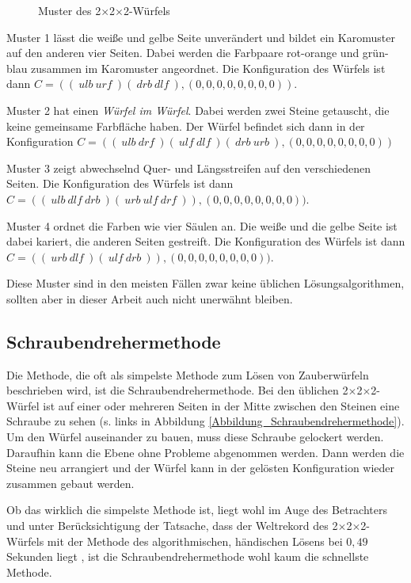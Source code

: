 \documentclass[12pt,a4paper, usenames, dvipsnames]{article}
\theoremstyle{mystyle}
\theoremstyle{definition}
\newcommand{\Ttwo}{2$\times$2$\times$2-}
\begin{document}
\begin{figure}[h]
\caption{Muster des \Ttwo Würfels}
\label{Abbildung_Muster}
\end{figure}

Muster 1 lässt die weiße und gelbe Seite unverändert und bildet ein Karomuster auf den anderen vier Seiten. Dabei werden die Farbpaare rot-orange und grün-blau zusammen im  Karomuster angeordnet. Die Konfiguration des Würfels ist dann $C = ((\ \textit{ulb} \ \textit{urf} \ )( \ \textit{drb} \ \textit{dlf} \ ),(0,0,0,0,0,0,0,0))$.

Muster 2 hat einen \textit{Würfel im Würfel}. Dabei werden zwei Steine getauscht, die keine gemeinsame Farbfläche haben. Der Würfel befindet sich dann in der Konfiguration $C = (( \ ulb \ drf \ )( \ ulf \ dlf \ )( \ drb \ urb \ ),(0,0,0,0,0,0,0,0))$

Muster 3 zeigt abwechselnd Quer- und Längsstreifen auf den verschiedenen Seiten. Die Konfiguration des Würfels ist dann $C = (( \ \textit{ulb} \ \textit{dlf} \ \textit{drb} \ )( \ \textit{urb} \ \textit{ulf} \ \textit{drf} \ )),(0,0,0,0,0,0,0,0))$.

Muster 4 ordnet die Farben wie vier Säulen an. Die weiße und die gelbe Seite ist dabei kariert, die anderen Seiten gestreift. Die Konfiguration des Würfels ist dann $C = ( (\ \textit{urb} \ \textit{dlf} \ )( \ \textit{ulf} \ \textit{drb} \ ) ),(0,0,0,0,0,0,0,0))$.


Diese Muster sind in den meisten Fällen zwar keine üblichen Lösungsalgorithmen, sollten aber in dieser Arbeit auch nicht unerwähnt bleiben.

%
%
%
%
%
%
%
%
%
%
%
%
%
%
%
%
%
%
%
\subsection{Schraubendrehermethode}

Die Methode, die oft als simpelste Methode zum Lösen von Zauberwürfeln beschrieben wird, ist die Schraubendrehermethode.
Bei den üblichen \Ttwo Würfel ist auf einer oder mehreren Seiten in der Mitte zwischen den Steinen eine Schraube zu sehen (s. links in Abbildung \ref{Abbildung_Schraubendrehermethode}).
Um den Würfel auseinander zu bauen, muss diese Schraube gelockert werden. Daraufhin kann die Ebene ohne Probleme abgenommen werden. 
Dann werden die Steine neu arrangiert und der Würfel kann in der gelösten Konfiguration wieder zusammen gebaut werden.

Ob das wirklich die simpelste Methode ist, liegt wohl im Auge des Betrachters und unter Berücksichtigung der Tatsache, dass der Weltrekord des \Ttwo Würfels mit der Methode des algorithmischen, händischen Lösens bei $0,49$ Sekunden liegt \cite{rekord}, ist die Schraubendrehermethode wohl kaum die schnellste Methode.
\end{document}
